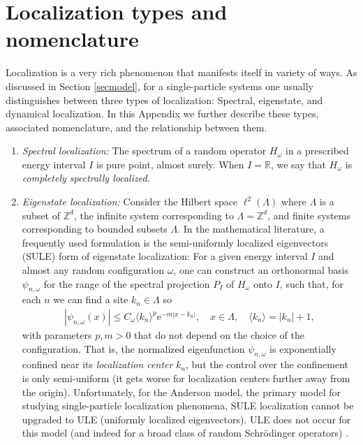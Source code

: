 \documentclass[12pt, a4paper,reqno]{amsart}
\numberwithin{equation}{section}
\newcommand\R{\mathbb R}
\newcommand\Z{\mathbb Z}
\newcommand\e{\mathrm{e}}
\newcommand\be{\begin{equation}\begin{aligned}}
\newcommand\ee{\end{aligned}\end{equation}}
\newcommand{\abs}[1]{\left\lvert #1 \right\rvert}
\newcommand\La{\Lambda}
\begin{document}
\appendix

\section{Localization types and nomenclature}\label{sec:nom}
Localization is a very rich phenomenon that manifests itself in variety of ways.  As  discussed in Section \ref{secmodel}, for a single-particle systems one usually distinguishes  between  three types of localization: Spectral, eigenstate, and dynamical localization.  In this Appendix  we further describe these types, associated nomenclature, and the relationship between them.

\begin{enumerate}


\item {\it Spectral localization:} The spectrum of a random operator $H_\omega$ in a prescribed energy interval  $I$ is pure point, almost surely.  When $I=\R$, we say that $H_\omega$ is {\it completely spectrally localized}.



\item {\it Eigenstate localization:}  Consider   the Hilbert space $\ell^2(\La )$ where $\La$ is a subset of $\Z^d$,  the infinite system corresponding to $\La=\Z^d$, and finite systems corresponding to  bounded subsets $\La$.
 In  the mathematical literature,  a frequently used formulation is the semi-uniformly localized eigenvectors (SULE) form of  eigenstate localization: For a given energy interval  $I$ and almost any random configuration $\omega$, one can construct an orthonormal basis $\psi_{n,\omega}$ for the range of the spectral projection $P_I$ of $H_\omega$ onto $I$, such that, for each $n$ we can find a site $k_n\in\La$  so
\be
\abs{\psi_{n,\omega}(x)}\le C_{\omega}\langle k_n\rangle^p\e^{-m|x-k_n|},\quad x\in\La,\quad \langle k_n\rangle=\abs{k_n}+1,
\ee
 with parameters $p,m>0$ that do not depend on the choice of the configuration. That is, the normalized eigenfunction $\psi_{n,\omega}$ is exponentially confined near its {\it localization center} $k_n$, but the control over the confinement is only semi-uniform (it gets worse for localization centers further away from the origin).  Unfortunately, for the Anderson model, the primary model for studying single-particle localization phenomena, SULE localization cannot be upgraded to ULE (uniformly localized eigenvectors).   ULE does not occur for this model (and indeed for a broad class of random Schr\"odinger operators) \cite{DJLS}. 
 

\end{enumerate}
\end{document}
